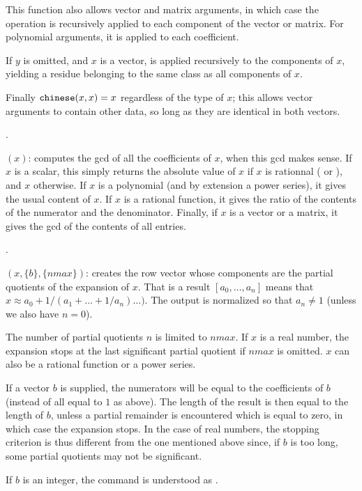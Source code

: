 This function also allows vector and matrix arguments, in which case the
operation is recursively applied to each component of the vector or matrix.
For polynomial arguments, it is applied to each coefficient.

If $y$ is omitted, and $x$ is a vector,  is applied recursively
to the components of $x$, yielding a residue belonging to the same class as all
components of $x$.

Finally ${\tt chinese}(x,x) = x$ regardless of the type of $x$; this allows
vector arguments to contain other data, so long as they are identical in both
vectors.

.

$(x)$: computes the gcd of all the coefficients of $x$,
when this gcd makes sense. If $x$ is a scalar, this simply returns the
absolute value of $x$ if $x$ is rationnal ( or ), and $x$
otherwise. If $x$ is a polynomial (and by extension a power series), it gives
the usual content of $x$. If $x$ is a rational function, it gives the ratio
of the contents of the numerator and the denominator. Finally, if $x$ is a
vector or a matrix, it gives the gcd of the contents of all entries.

.

$(x,\{b\},\{nmax\})$: creates the row vector whose
components are the partial quotients of the 
expansion of $x$. That is a result $[a_0,\dots,a_n]$ means that $x \approx
a_0+1/(a_1+\dots+1/a_n)\dots)$. The output is normalized so that $a_n \neq 1$
(unless we also have $n = 0$).

The number of partial quotients $n$ is limited to $nmax$. If $x$ is a real
number, the expansion stops at the last significant partial quotient if
$nmax$ is omitted. $x$ can also be a rational function or a power series.

If a vector $b$ is supplied, the numerators will be equal to the coefficients
of $b$ (instead of all equal to $1$ as above). The length of the result is
then equal to the length of $b$, unless a partial remainder is encountered
which is equal to zero, in which case the expansion stops. In the case of
real numbers, the stopping criterion is thus different from the one mentioned
above since, if $b$ is too long, some partial quotients may not be
significant.

If $b$ is an integer, the command is understood as .

